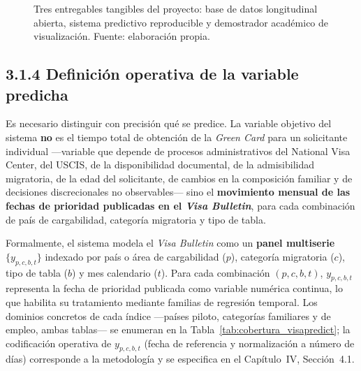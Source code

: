 \documentclass[12pt,letterpaper]{report}
\begin{document}
\begin{figure}[H]
    \caption[Tres entregables tangibles del proyecto.]{Tres entregables tangibles del proyecto: base de datos longitudinal abierta, sistema predictivo reproducible y demostrador académico de visualización. Fuente: elaboración propia.}
    \label{fig:entregables_visapredict}
\end{figure}

\subsection*{3.1.4 Definición operativa de la variable predicha}

Es necesario distinguir con precisión qué se predice. La variable objetivo del sistema \textbf{no} es el tiempo total de obtención de la \textit{Green Card} para un solicitante individual ---variable que depende de procesos administrativos del National Visa Center, del USCIS, de la disponibilidad documental, de la admisibilidad migratoria, de la edad del solicitante, de cambios en la composición familiar y de decisiones discrecionales no observables--- sino el \textbf{movimiento mensual de las fechas de prioridad publicadas en el \textit{Visa Bulletin}}, para cada combinación de país de cargabilidad, categoría migratoria y tipo de tabla.

Formalmente, el sistema modela el \textit{Visa Bulletin} como un \textbf{panel multiserie} $\{y_{p,c,b,t}\}$ indexado por país o área de cargabilidad ($p$), categoría migratoria ($c$), tipo de tabla ($b$) y mes calendario ($t$). Para cada combinación $(p, c, b, t)$, $y_{p,c,b,t}$ representa la fecha de prioridad publicada como variable numérica continua, lo que habilita su tratamiento mediante familias de regresión temporal. Los dominios concretos de cada índice ---países piloto, categorías familiares y de empleo, ambas tablas--- se enumeran en la Tabla~\ref{tab:cobertura_visapredict}; la codificación operativa de $y_{p,c,b,t}$ (fecha de referencia y normalización a número de días) corresponde a la metodología y se especifica en el Capítulo~IV, Sección~4.1.
\end{document}

